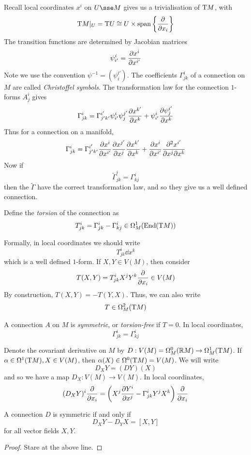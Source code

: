 \documentclass{article}
\begin{document}
Recall local coordinates \(x^i\) on \(U \sse M\) gives us a trivialisation of \(\mathrm{T} M\), with
\[\mathrm{T} M \vert_U = \mathrm{T} U \cong U \times \operatorname{span}\left\{\pdv{x_i}\right\}\]
The transition functions are determined by Jacobian matrices 
\[\psi^i_{i'} = \pdv{x^i}{x^{i'}}\]
Note we use the convention \(\psi^{-1} = (\psi^{i'}_i)\). The coefficients \(\Gamma^i_{jk}\) of a connection on \(M\) are called \emph{Christoffel symbols}. The transformation law for the connection \(1\)-forms \(A^i_j\) gives
\[\Gamma^i_{jk} = \Gamma^{i'}_{j'k'}\psi^{i}_{i'}\psi^{j'}_j\pdv{x^{k'}}{x^k} + \psi^i_{i'}\pdv{\psi^{i'}_j}{x^k}\]
Thus for a connection on a manifold,
\[\Gamma^i_{jk} = \Gamma^{i'}_{j'k'}\pdv{x^i}{x^{i'}}\pdv{x^{j'}}{x^j}\pdv{x^{k'}}{x^k} + \pdv{x^i}{x^{i'}}\pdv[2]{x^{i'}}{x^j}{x^k}\]
Now if
\[\widetilde\Gamma^i_{jk} = \Gamma^i_{kj}\]
then the \(\widetilde\Gamma\) have the correct transformation law, and so they give us a well defined connection.

\begin{definition}
    [torsion]
    Define the \emph{torsion} of the connection as
    \[T^i_{jk} = \Gamma^i_{jk} - \Gamma^i_{kj} \in \Omega^1_M(\operatorname{End}(\mathrm{T} M))\]
\end{definition}

Formally, in local coordinates we should write
\[T^i_{jk}\dd x^k\]
which is a well defined \(1\)-form. If \(X, Y \in V(M)\), then consider
\[T(X, Y) = T^i_{jk}X^jY^k\pdv{x_i} \in V(M)\]
By construction, \(T(X, Y) = -T(Y, X)\). Thus, we can also write
\[T \in \Omega^2_M(\mathrm{T} M)\]

\begin{definition}
    [symmetric] A connection \(A\) on \(M\) is \emph{symmetric}, or \emph{torsion-free} if \(T = 0\). In local coordinates,
    \[\Gamma^i_{jk} = \Gamma^i_{kj}\]
\end{definition}

Denote the covariant derivative on \(M\) by \(D : V(M) = \Omega^0_M(\mathbb{R} M) \to \Omega^1_M(\mathrm{T} M)\). If \(\alpha \in \Omega^1(\mathrm{T} M), X \in V(M)\), then \(\alpha(X) \in \Omega^0(\mathrm{T} M) = V(M)\). We will write
\[D_X Y = (DY)(X)\]
and so we have a map \(D_X : V(M) \to V(M)\). In local coordinates,
\[(D_X Y)^i\pdv{x_i} = \left(X^j\pdv{Y^i}{x^j} - \Gamma^i_{jk}Y^jX^k\right)\pdv{x_i}\]

\begin{proposition}
    A connection \(D\) is symmetric if and only if
    \[D_XY - D_YX = [X, Y]\]
    for all vector fields \(X, Y\).
\end{proposition}
\begin{proof}
    Stare at the above line.
\end{proof}
\end{document}
